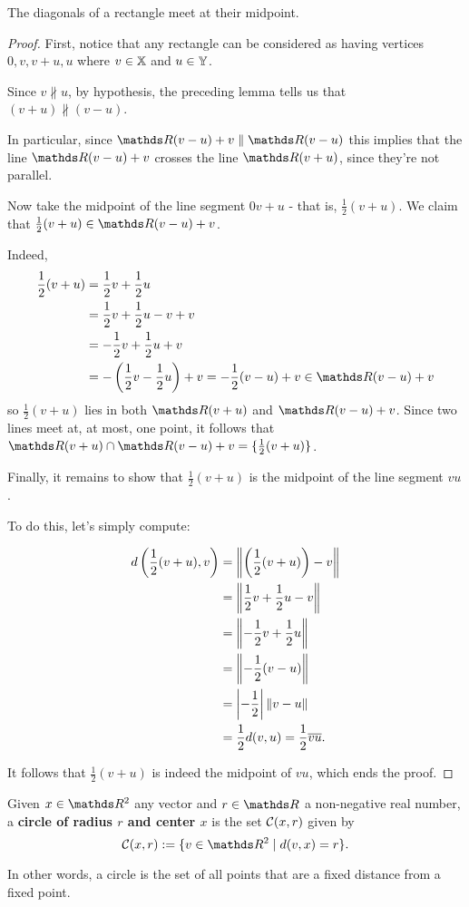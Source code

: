 \begin{cor}
	The diagonals of a rectangle meet at their midpoint.
\end{cor}
\begin{proof}
	First, notice that any rectangle can be considered as having vertices $0,v,v+u,u$ where $v\in\mathbb X$ and $u\in\mathbb{Y}$.
	
	Since $v\nparallel u$, by hypothesis, the preceding lemma tells us that $(v+u)\nparallel(v-u)$.
	
	In particular, since $\R(v-u)+v\parallel\R (v-u)$ this implies that the line $\R(v-u)+v$ crosses the line $\R(v+u)$, since they're not parallel.
	
	Now take the midpoint of the line segment $0v+u$ - that is, $\frac{1}{2}(v+u)$. We claim that $\frac{1}{2}(v+u)\in \R(v-u)+v$.
	
	Indeed, 
	\begin{align*}
		\frac{1}{2}(v+u)&=\frac{1}{2}v+\frac{1}{2}u\\
		&=\frac{1}{2}v+\frac{1}{2}u-v+v\\
		&=-\frac{1}{2}v+\frac{1}{2}u+v\\
		&=-\left(\frac{1}{2}v-\frac{1}{2}u\right)+v=-\frac{1}{2}(v-u)+v\in \R(v-u)+v
	\end{align*}so $\frac{1}{2}(v+u)$ lies in both $\R(v+u)$ and $\R(v-u)+v$. Since two lines meet at, at most, one point, it follows that $\R(v+u)\cap\R(v-u)+v=\{\frac{1}{2}(v+u)\}$.
	
	\bigskip
	Finally, it remains to show that $\frac{1}{2}(v+u)$ is the midpoint of the line segment $vu$.
	
	To do this, let's simply compute:
	
	\begin{align*}
		d\left(\frac{1}{2}(v+u),v\right)&=\left\Vert\left(\frac{1}{2}(v+u)\right)-v\right\Vert\\
		&=\left\Vert\frac{1}{2}v+\frac{1}{2}u-v\right\Vert\\
		&=\left\Vert-\frac{1}{2}v+\frac{1}{2}u\right\Vert\\
		&=\left\Vert-\frac{1}{2}(v-u)\right\Vert\\
		&=\left\vert-\frac{1}{2}\right\vert\left\Vert v-u\right\Vert\\
		&=\frac{1}{2}d(v,u)=\frac{1}{2}\overline{vu}.
	\end{align*}
	
	It follows that $\frac{1}{2}(v+u)$ is indeed the midpoint of $vu$, which ends the proof.
\end{proof}

\begin{df}
	Given $x\in \R^2$ any vector and $r\in \R$ a non-negative real number, a \textbf{circle of radius $r$ and center $x$} is the set $\mathcal C(x,r)$ given by
	\[\mc C(x,r):=\{v\in \R^2\mid d(v,x)=r\}.\]
	
	In other words, a circle is the set of all points that are a fixed distance from a fixed point.
\end{df}

